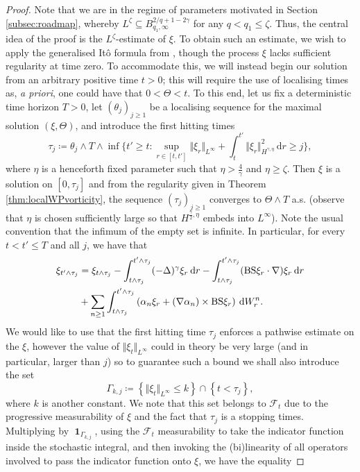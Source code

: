 \documentclass[11pt, a4paper,oneside, reqno]{amsart}
\theoremstyle{remark} %
\theoremstyle{definition} %
\numberwithin{theorem}{section}
\numberwithin{equation}{section}
\newcommand{\norm}[1]{\Vert #1 \Vert}
\newcommand{\BS}{{\rm BS}}
\newcommand{\del}{\Delta}
\newcommand{\grad}{\nabla}
\newcommand{\gam}{\gamma}
\newcommand{\dd}{\hspace{2pt}\mathrm{d}}
\DeclareMathOperator{\ind}{\mathbf{1}}
\begin{document}
\begin{proof}
Note that we are in the regime of parameters motivated in Section \ref{subsec:roadmap}, whereby $L^\zeta \subseteq B^{2/q+1-2\gam}_{q_1,\infty}$ for any $q < q_1 \leq \zeta$. Thus, the central idea of the proof is the $L^\zeta$-estimate of $\xi$. To obtain such an estimate, we wish to apply the generalised It\^{o} formula from \cite[Proposition A.1]{debussche2016degenerate}, though the process $\xi$ lacks sufficient regularity at time zero. To accommodate this, we will instead begin our solution from an arbitrary positive time $t>0$; this will require the use of localising times as, \textit{a priori}, one could have that $0 < \Theta < t$. To this end, let us fix a deterministic time horizon $T>0$, let $(\theta_j)_{j\geq 1}$ be a localising sequence for the maximal solution $(\xi, \Theta)$, and introduce the first hitting times
    $$\tau_j \coloneqq \theta_j \wedge T \wedge \inf\big\{t' \geq t: \sup_{r\in [t,t']}\norm{\xi_{r}}_{L^{\infty}} + \int_t^{t'}\norm{\xi_{r}}_{H^{\gamma, \eta}}^2\dd r \geq j \big\},$$
    where $\eta$ is a henceforth fixed parameter such that $\eta > \frac{4}{\gamma}$ and $\eta \geq \zeta$. Then $\xi$ is a solution on $[0,\tau_j]$ and from the regularity given in Theorem \ref{thm:localWPvorticity}, the sequence $(\tau_j)_{j\geq 1}$ converges to $\Theta \wedge T$ a.s. (observe that $\eta$ is chosen sufficiently large so that $H^{\frac{\gamma}{2}, \eta}$ embeds into $L^\infty$). Note the usual convention that the infimum of the empty set is infinite. In particular, for every $t < t' \leq T$ and all $j$, we have that
\begin{align*}
    \xi_{t' \wedge \tau_j}  &= \xi_{t \wedge \tau_j} - \int_{t \wedge \tau_j}^{t'\wedge\tau_j}(-\del)^\gam \xi_r\dd r -\int_{t \wedge \tau_j}^{t'\wedge\tau_j}(\BS\xi_r \cdot \grad)\xi_r \dd r\\ &+ \sum_{n \geq 1} \int_{t \wedge \tau_j}^{t'\wedge\tau_j}\left(\alpha_n\xi_r + (\nabla \alpha_n) \times \BS\xi_r\right)\dd W^n_r.
\end{align*}
We would like to use that the first hitting time $\tau_j$ enforces a pathwise estimate on the $\xi$, however the value of $\norm{\xi_t}_{L^{\infty}}$ could in theory be very large (and in particular, larger than $j$) so to guarantee such a bound we shall also introduce the set
$$\Gamma_{k,j} \coloneqq \left\{\norm{\xi_t}_{L^\infty} \leq k \right\} \cap \left\{ t < \tau_j\right\},$$
where $k$ is another constant. We note that this set belongs to $\mathcal{F}_t$ due to the progressive measurability of $\xi$ and the fact that $\tau_j$ is a stopping times. Multiplying by $\ind_{\Gamma_{k,j}}$, using the $\mathcal{F}_t$ measurability to take the indicator function inside the stochastic integral, and then invoking the (bi)linearity of all operators involved to pass the indicator function onto $\xi$, we have the equality

\end{proof}
\end{document}
